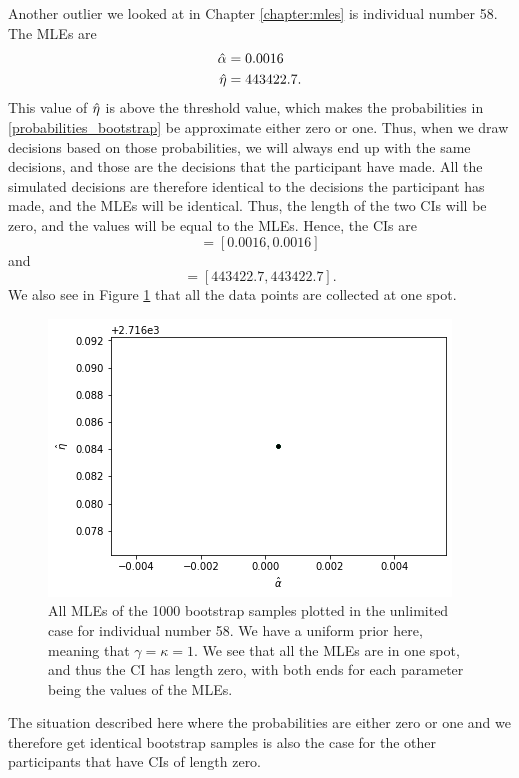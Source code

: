 Another outlier we looked at in Chapter \ref{chapter:mles} is individual number 58. The MLEs are 
\begin{equation*}
    \begin{aligned}
        \hat{\alpha} &= 0.0016\\
        \hat{\eta} &= 443422.7.
    \end{aligned}
\end{equation*}
This value of $\hat{\eta}$ is above the threshold value, which makes the probabilities in \eqref{probabilities_bootstrap} be approximate either zero or one. Thus, when we draw decisions based on those probabilities, we will always end up with the same decisions, and those are the decisions that the participant have made. All the simulated decisions are therefore identical to the decisions the participant has made, and the MLEs will be identical. Thus, the length of the two CIs will be zero, and the values will be equal to the MLEs. Hence, the CIs are
\begin{equation*}
    [\hat{\alpha}^{*(5)}_{1000},\hat{\alpha}^{*(95)}_{1000}] = [0.0016,0.0016]
\end{equation*}
and
\begin{equation*}
    [\hat{\eta}^{*(5)}_{1000},\hat{\eta}^{*(95)}_{1000}] = [443422.7,443422.7].
\end{equation*}
We also see in Figure \ref{fig:ci_unlim_person_58} that all the data points are collected at one spot. 
\begin{figure}
    \centering
    \includegraphics[scale=0.7]{pictures/ci_unlim_person58.png}
    \caption[MLEs of bootstrap samples individual number 58, unlimited]{All MLEs of the 1000 bootstrap samples plotted in the unlimited case for individual number 58. We have a uniform prior here, meaning that $\gamma=\kappa=1$. We see that all the MLEs are in one spot, and thus the CI has length zero, with both ends for each parameter being the values of the MLEs.}
    \label{fig:ci_unlim_person_58}
\end{figure}
The situation described here where the probabilities are either zero or one and we therefore get identical bootstrap samples is also the case for the other participants that have CIs of length zero. 

